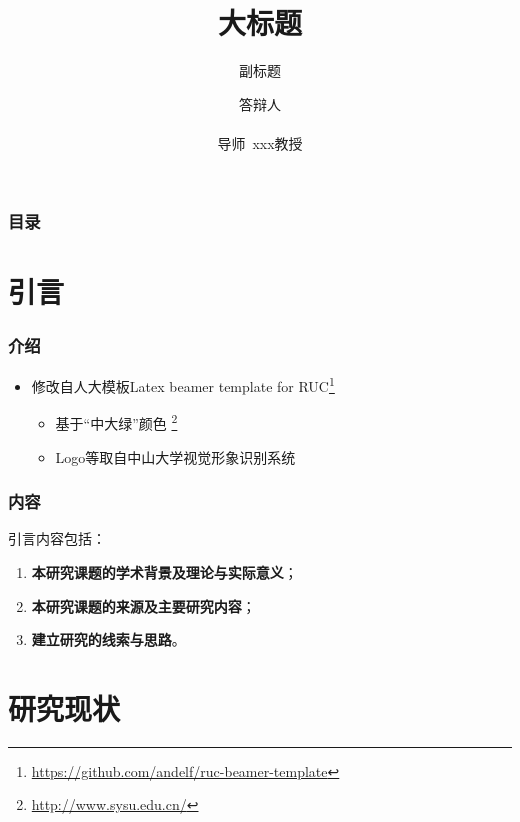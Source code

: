 \documentclass[AutoFakeBold,AutoFakeSlant]{beamer}
\title[中山大学硕士学位论文答辩]{
  大标题}
\subtitle{副标题}
\institute[Sun Yat-Sen University]{
  XX学院 \\ 
  中山大学}
\date[\today]{\ctoday}
\begin{document}
\author[Author Name]{
  答辩人 
  \texorpdfstring{\\}{}
  \texorpdfstring{\\ {\small 导师~xxx教授}}{}
}

\begin{frame}
  \titlepage
\end{frame}
\setcounter{framenumber}{0}

\begin{frame}
  \frametitle{目\quad 录}
  \tableofcontents[hideallsubsections]
\end{frame}

\section{引言}

\begin{frame}
  \frametitle{介绍}

  \begin{itemize}
    \item 修改自人大模板Latex beamer template for RUC\footnote{\url{https://github.com/andelf/ruc-beamer-template}}
    \begin{itemize}
      \item 基于“\textcolor{sysugreen}{中大绿}”颜色 \footnote{\url{http://www.sysu.edu.cn/}}
      \item Logo等取自中山大学视觉形象识别系统
    \end{itemize}
  \end{itemize}
\end{frame}

\begin{frame}
  \frametitle{内容}

  引言内容包括：
  \begin{enumerate}
    \item \textbf{本研究课题的学术背景及理论与实际意义}；
    \item \textbf{本研究课题的来源及主要研究内容}；
    \item \textbf{建立研究的线索与思路}。
  \end{enumerate}

\end{frame}

\section{研究现状}
\end{document}
